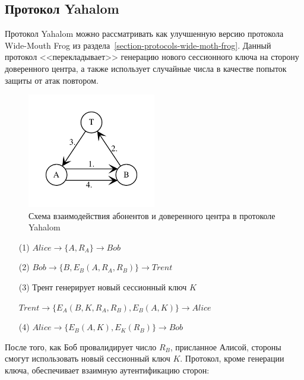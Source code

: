 \subsection{Протокол Yahalom}\label{section-protocols-yahalom}

Протокол Yahalom можно рассматривать как улучшенную версию протокола Wide-Mouth Frog из раздела~\ref{section-protocols-wide-moth-frog}. Данный протокол <<перекладывает>> генерацию нового сессионного ключа на сторону доверенного центра, а также использует случайные числа в качестве попыток защиты от атак повтором.

\begin{figure}[!htb]
    \centering
    \includegraphics[width=0.5\textwidth]{pic/key_distribution-yahalom}
    \caption{Схема взаимодействия абонентов и доверенного центра в протоколе Yahalom\label{fig:key_distribution-yahalom}}
\end{figure}

\begin{samepage}\begin{itemize}
	\item[(1)] $Alice \to \{ A, R_A \} \to Bob$
	\item[(2)] $Bob \to \{ B, E_B( A, R_A, R_B ) \} \to Trent$
	\item[(3)] Трент генерирует новый сессионный ключ $K$
	\item[{}] $Trent \to \{ E_A( B, K, R_A, R_B ), E_B(A, K) \} \to Alice$
	\item[(4)] $Alice \to \{ E_B( A, K ), E_K( R_B ) \} \to Bob$
\end{itemize}\end{samepage}

После того, как Боб провалидирует число $R_B$, присланное Алисой, стороны смогут использовать новый сессионный ключ $K$. Протокол, кроме генерации ключа, обеспечивает взаимную аутентификацию сторон:

